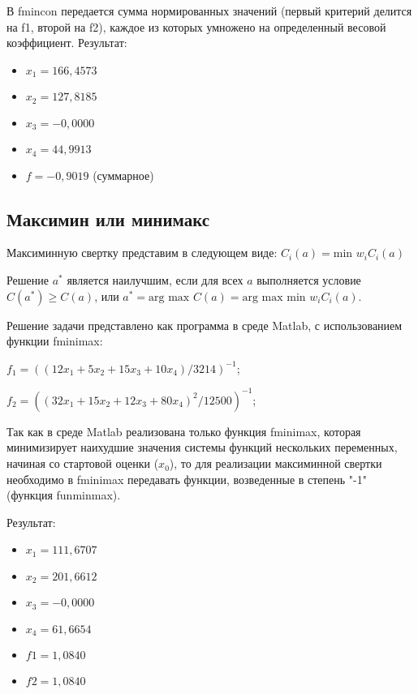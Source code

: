 В fmincon передается сумма нормированных значений (первый критерий делится на f1, второй на f2), каждое из которых умножено на определенный весовой коэффициент. Результат:
\begin{itemize}
\item $x_1 = 166,4573$
\item $x_2 = 127,8185$
\item $x_3 = -0,0000$
\item $x_4 = 44,9913$
\item $f = -0,9019$ (суммарное)
\end{itemize}

\subsection{Максимин или минимакс}

Максиминную свертку представим в следующем виде: $C_i(a)= \text{min } w_i C_i(a)$

Решение $a^*$ является наилучшим, если для всех $a$ выполняется условие $C(a^*) \geq C(a)$, или $a^* = \text{arg max } C(a) = \text{arg max min } w_i C_i (a)$.

Решение задачи представлено как программа в среде Matlab, с использованием функции fminimax:

$f_1=((12x_1+5x_2+15x_3+10x_4)/3214)^{-1}$;

$f_2=((32x_1+15x_2+12x_3+80x_4 )^2/12500)^{-1}$;





Так как в среде Matlab реализована только функция fminimax, которая минимизирует наихудшие значения системы функций нескольких переменных, начиная со стартовой оценки ($x_0$), то для реализации максиминной свертки необходимо в fminimax передавать функции, возведенные в степень "-1" (функция funminmax).

Результат:
\begin{itemize}
\item $x_1 = 111,6707$
\item $x_2 = 201,6612$
\item $x_3 = -0,0000$
\item $x_4 = 61,6654$
\item $f1 = 1,0840$
\item $f2 = 1,0840$
\end{itemize}

